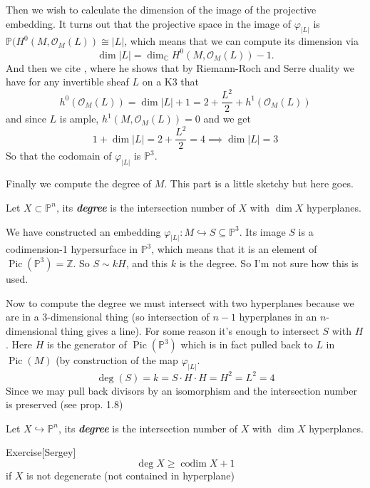 Then we wish to calculate the dimension of the image of the projective embedding. It turns out that the projective space in the image of $\varphi_{|L|}$ is $\mathbb{P}(H^{0}(M,\mathcal{O}_M(L))\cong |L|$, which means that we can compute its dimension via
\[\dim |L| =\dim_{\mathbb{C}}H^{0}(M,\mathcal{O}_M(L))-1.\]
And then we cite \cite{saint-donat}, where he shows that by Riemann-Roch and Serre duality we have for any invertible sheaf $L$ on a K3 that
\[h^{0}(\mathcal{O}_M(L))=\dim |L| +1=2+\frac{L^2}{2}+h^{1}(\mathcal{O}_M(L))\]
and since $L$ is ample, $h^{1}(M,\mathcal{O}_M(L))=0$ and we get 
\[1+\dim |L| =2+\frac{L^2}{2}=4\implies \dim |L| =3\]
So that the codomain of $\varphi_{|L|}$ is $\mathbb{P}^{3}$.

Finally we compute the degree of $M$. {\color{6}This part is a little sketchy} but here goes.

\begin{defn}\leavevmode
	Let $X\subset \mathbb{P}^n$, its \textit{\textbf{degree}} is the intersection number of $X$ with $\dim X$ hyperplanes.
\end{defn}

We have constructed an embedding $\varphi_{|L|}:M\hookrightarrow S\subseteq \mathbb{P}^3$. Its image $S$ is a codimension-1 hypersurface in $\mathbb{P}^3$, which means that it is an element  of  $\operatorname{Pic}(\mathbb{P}^3) =\mathbb{Z}$. So $S \sim kH$, and this $k$ is the degree. {\color{6}So I'm not sure how this is used.}

Now to compute the degree we must intersect with two hyperplanes because we are in a 3-dimensional thing (so intersection of $n-1$ hyperplanes in an  $ n$-dimensional thing gives a line). {\color{6}For some reason} it's enough to intersect $S$ with $H$. Here $H$ is the generator of $\operatorname{Pic}(\mathbb{P}^3)$ which is in fact pulled back to $L$ in $\operatorname{Pic}(M)$ (by construction of the map $\varphi_{|L|}$.
\[\operatorname{deg}(S)=k=S\cdot H\cdot H=H^2=L^2=4\]
Since we may pull back divisors by an isomorphism and the intersection number is preserved (see \cite{beauville} prop. 1.8)

\begin{defn}\leavevmode
	Let $X\hookrightarrow  \mathbb{P}^n$, its \textit{\textbf{degree}} is the intersection number of $X$ with $\dim X$ hyperplanes.
\end{defn}

\begin{thing5}{Exercise}[Sergey]\leavevmode
	\[\operatorname{deg}X\geq \operatorname{codim}X+1\]
	if $X$ is not degenerate (not contained in hyperplane)
\end{thing5}

